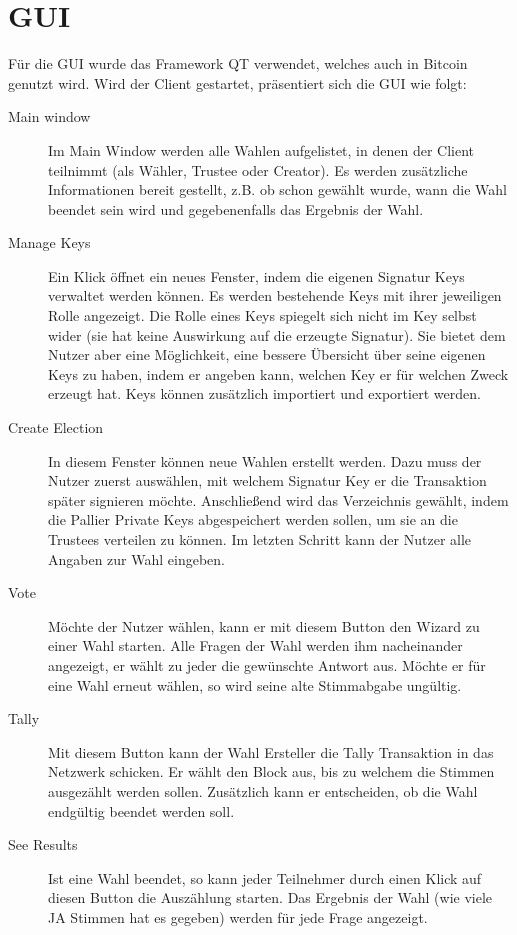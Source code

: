 \documentclass[colorback,accentcolor=tud1b]{tudreport}
\begin{document}
\section{GUI}
Für die GUI wurde das Framework QT verwendet, welches auch in Bitcoin genutzt wird. Wird der Client gestartet, präsentiert sich die GUI wie folgt:
\begin{description}

\item[Main window] Im Main Window werden alle Wahlen aufgelistet, in denen der Client teilnimmt (als Wähler, Trustee oder Creator). Es werden zusätzliche Informationen bereit gestellt, z.B. ob schon gewählt wurde, wann die Wahl beendet sein wird und gegebenenfalls das Ergebnis der Wahl. 

\item[Manage Keys] 
Ein Klick öffnet ein neues Fenster, indem die eigenen Signatur Keys verwaltet werden können. Es werden bestehende Keys mit ihrer jeweiligen Rolle angezeigt. Die Rolle eines Keys spiegelt sich nicht im Key selbst wider (sie hat keine Auswirkung auf die erzeugte Signatur). Sie bietet dem Nutzer aber eine Möglichkeit, eine bessere Übersicht über seine eigenen Keys zu haben, indem er angeben kann, welchen Key er für welchen Zweck erzeugt hat. Keys können zusätzlich importiert und exportiert werden.

\item[Create Election] In diesem Fenster können neue Wahlen erstellt werden. Dazu muss der Nutzer zuerst  auswählen, mit welchem Signatur Key er die Transaktion später signieren möchte. Anschließend wird das Verzeichnis gewählt, indem die Pallier Private Keys abgespeichert werden sollen, um sie an die Trustees verteilen zu können. Im letzten Schritt kann der Nutzer alle Angaben zur Wahl eingeben.

\item[Vote] Möchte der Nutzer wählen, kann er mit diesem Button den Wizard zu einer Wahl starten. Alle Fragen der Wahl werden ihm nacheinander angezeigt, er wählt zu jeder die gewünschte Antwort aus. Möchte er für eine Wahl erneut wählen, so wird seine alte Stimmabgabe ungültig.

\item[Tally] Mit diesem Button kann der Wahl Ersteller die Tally Transaktion in das Netzwerk schicken. Er wählt den Block aus, bis zu welchem die Stimmen ausgezählt werden sollen. Zusätzlich kann er entscheiden, ob die Wahl endgültig beendet werden soll.

\item[See Results] Ist eine Wahl beendet, so kann jeder Teilnehmer durch einen Klick auf diesen Button die Auszählung starten. Das Ergebnis der Wahl (wie viele JA Stimmen hat es gegeben) werden für jede Frage angezeigt.

\end{description}  
\end{document}
